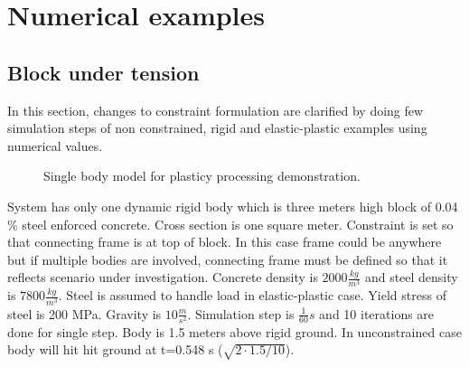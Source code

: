 \section{Numerical examples}

\subsection{Block under tension}
In this section, changes to constraint formulation are clarified by doing few simulation steps
of non constrained, rigid and
elastic-plastic examples using numerical values.

\begin{figure}[htb!]
\centering
{}
\caption{Single body model for plasticy processing demonstration.}
\label{fig:tensionModel}
\end{figure}

System has only one dynamic rigid body which is three meters high block of 0.04 \% steel enforced concrete. 
Cross section is one square meter.
Constraint is set so that connecting frame is at top of block. 
In this case frame could be anywhere but if multiple bodies are involved, connecting frame must be defined
so that it reflects scenario under investigation.
Concrete density is $2000 \frac{kg}{m^3}$ and steel density is $7800 \frac{kg}{m^3}$. 
Steel is assumed to handle load in elastic-plastic case. Yield stress of steel is 200 MPa.
Gravity is $10 \frac{m}{s^2}$. Simulation step is $\frac{1}{60} s$ and 10 
iterations are done for single step.
Body is 1.5 meters above rigid ground. In unconstrained case body will hit hit ground at t=0.548 s 
($\sqrt{2 \cdot 1.5 / 10}$).

